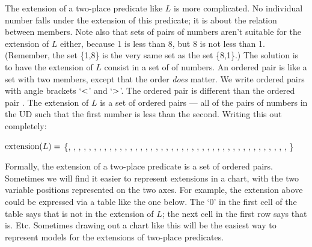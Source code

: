 The extension of a two-place predicate like $L$ is more complicated. No individual number falls under the extension of this predicate; it is about the relation between members. Note also that sets of pairs of numbers aren't suitable for the extension of $L$ either, because 1 is less than 8, but 8 is not less than 1. (Remember, the set \{1,8\} is the very same set as the set \{8,1\}.) The solution is to have the extension of $L$ consist in a set of  of numbers. An ordered pair is like a set with two members, except that the order \emph{does} matter. We write ordered pairs with angle brackets `$<$' and `$>$'. The ordered pair \mbox{} is different than the ordered pair \mbox{}. The extension of $L$ is a set of ordered pairs --- all of the pairs of numbers in the UD such that the first number is less than the second. Writing this out completely:


$\mbox{extension}(L)=$ \{, , , , , , , , ,
, , , , , , , ,
, , , , , , ,
, , , , , ,
, , , , ,
, , , , 
, , ,
, 
%
\}

Formally, the extension of a two-place predicate is a set of ordered pairs. Sometimes we will find it easier to represent extensions in a chart, with the two variable positions represented on the two axes. For example, the extension above could be expressed via a table like the one below. The `0' in the first cell of the table says that  is not in the extension of $L$; the next cell in the first row says that  is. Etc. Sometimes drawing out a chart like this will be the easiest way to represent models for the extensions of two-place predicates.


